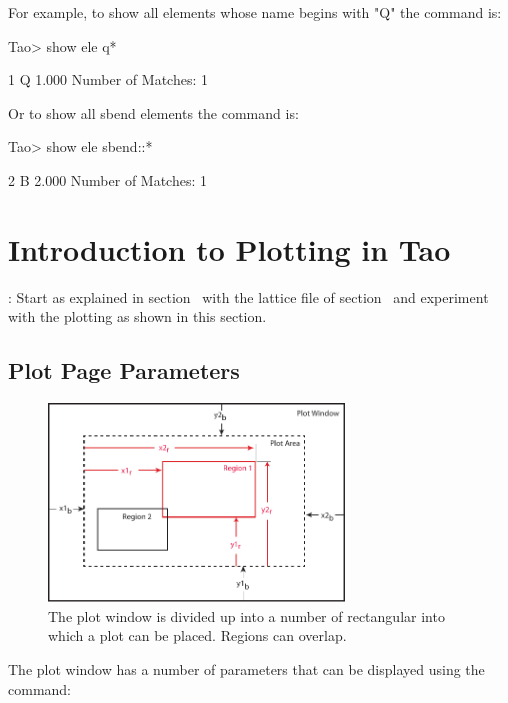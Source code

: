 \documentclass{hitec}
\newcommand{\Section}[1]{\section{#1}\vspace*{-1ex}}
\begin{document}
For example, to show all elements whose name begins with "Q" the command is:
{\small
\begin{code}
Tao> show ele q*

         1  Q                                                1.000
Number of Matches: 1
\end{code}}

Or to show all sbend elements the command is:
{\small
\begin{code}  
Tao> show ele sbend::*

         2  B                                                2.000
Number of Matches: 1
\end{code}}

\Section{Introduction to Plotting in Tao}

: Start \tao as explained in section~ with the lattice file
 of section~ and experiment with the plotting as shown 
in this section.

\subsection{Plot Page Parameters}

\begin{figure}[tb]
  \centering
  \includegraphics[width=0.7\textwidth]{plot-page.pdf}
  \caption{The plot window is divided up into a number of rectangular  into
which a plot  can be placed. Regions can overlap.}
  \label{f:plot.regions}
\end{figure}


The plot window has a number of parameters that can be displayed using the 
command:
\end{document}
